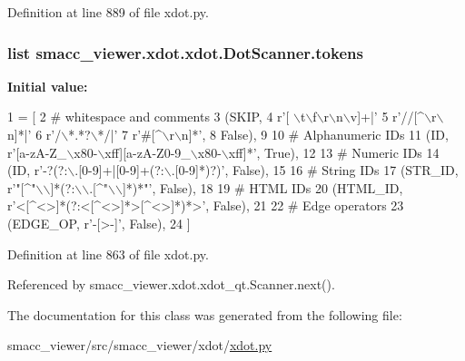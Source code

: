 Definition at line 889 of file xdot.\+py.

\subsubsection[{\texorpdfstring{tokens}{tokens}}]{\setlength{\rightskip}{0pt plus 5cm}list smacc\+\_\+viewer.\+xdot.\+xdot.\+Dot\+Scanner.\+tokens\hspace{0.3cm}{\ttfamily [static]}}\hypertarget{classsmacc__viewer_1_1xdot_1_1xdot_1_1DotScanner_a6419d15f580707951d00dc7cc61d9dc4}{}\label{classsmacc__viewer_1_1xdot_1_1xdot_1_1DotScanner_a6419d15f580707951d00dc7cc61d9dc4}
{\bfseries Initial value\+:}
\begin{DoxyCode}
1 = [
2         \textcolor{comment}{# whitespace and comments}
3         (SKIP,
4             \textcolor{stringliteral}{r'[ \(\backslash\)t\(\backslash\)f\(\backslash\)r\(\backslash\)n\(\backslash\)v]+|'}
5             \textcolor{stringliteral}{r'//[^\(\backslash\)r\(\backslash\)n]*|'}
6             \textcolor{stringliteral}{r'/\(\backslash\)*.*?\(\backslash\)*/|'}
7             \textcolor{stringliteral}{r'#[^\(\backslash\)r\(\backslash\)n]*'},
8         \textcolor{keyword}{False}),
9 
10         \textcolor{comment}{# Alphanumeric IDs}
11         (ID, \textcolor{stringliteral}{r'[a-zA-Z\_\(\backslash\)x80-\(\backslash\)xff][a-zA-Z0-9\_\(\backslash\)x80-\(\backslash\)xff]*'}, \textcolor{keyword}{True}),
12 
13         \textcolor{comment}{# Numeric IDs}
14         (ID, \textcolor{stringliteral}{r'-?(?:\(\backslash\).[0-9]+|[0-9]+(?:\(\backslash\).[0-9]*)?)'}, \textcolor{keyword}{False}),
15 
16         \textcolor{comment}{# String IDs}
17         (STR\_ID, \textcolor{stringliteral}{r'"[^"\(\backslash\)\(\backslash\)]*(?:\(\backslash\)\(\backslash\).[^"\(\backslash\)\(\backslash\)]*)*"'}, \textcolor{keyword}{False}),
18 
19         \textcolor{comment}{# HTML IDs}
20         (HTML\_ID, \textcolor{stringliteral}{r'<[^<>]*(?:<[^<>]*>[^<>]*)*>'}, \textcolor{keyword}{False}),
21 
22         \textcolor{comment}{# Edge operators}
23         (EDGE\_OP, \textcolor{stringliteral}{r'-[>-]'}, \textcolor{keyword}{False}),
24     ]
\end{DoxyCode}


Definition at line 863 of file xdot.\+py.



Referenced by smacc\+\_\+viewer.\+xdot.\+xdot\+\_\+qt.\+Scanner.\+next().



The documentation for this class was generated from the following file\+:\begin{DoxyCompactItemize}
\item 
smacc\+\_\+viewer/src/smacc\+\_\+viewer/xdot/\hyperlink{xdot_8py}{xdot.\+py}\end{DoxyCompactItemize}
